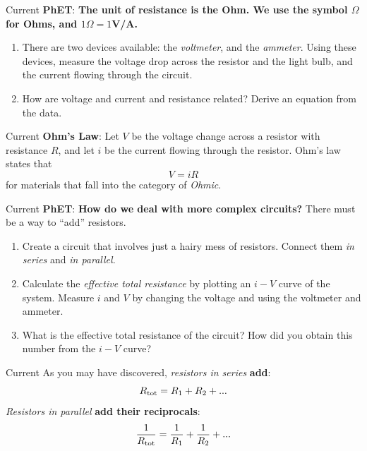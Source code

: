 \documentclass{beamer}
\begin{document}
\begin{frame}{Current}
\textbf{\alert{PhET}}: \textbf{The unit of resistance is the Ohm.  We use the symbol $\Omega$ for Ohms, and $1\Omega = 1$V/A.}
\begin{enumerate}
\item There are two devices available: the \textit{voltmeter}, and the \textit{ammeter}.  Using these devices, measure the voltage drop across the resistor and the light bulb, and the current flowing through the circuit.
\item How are voltage and current and resistance related?  Derive an equation from the data.
\end{enumerate}
\end{frame}

\begin{frame}{Current}
\textbf{Ohm's Law}: Let $V$ be the voltage change across a resistor with resistance $R$, and let $i$ be the current flowing through the resistor.  Ohm's law states that
\begin{equation}
\boxed{
V = iR}
\end{equation}
for materials that fall into the category of \textit{Ohmic}.
\end{frame}

\begin{frame}{Current}
\textbf{\alert{PhET}}: \textbf{How do we deal with more complex circuits?} There must be a way to ``add'' resistors.
\begin{enumerate}
\item Create a circuit that involves just a hairy mess of resistors.  Connect them \textit{in series} and \textit{in parallel}.
\item Calculate the \textit{effective total resistance} by plotting an $i-V$ curve of the system.  Measure $i$ and $V$ by changing the voltage and using the voltmeter and ammeter.
\item What is the effective total resistance of the circuit?  How did you obtain this number from the $i-V$ curve?
\end{enumerate}
\end{frame}

\begin{frame}{Current}
As you may have discovered, \textit{resistors in series} \textbf{add}:
\begin{equation}
R_{\rm tot} = R_1 + R_2 + ...
\end{equation}
\textit{Resistors in parallel} \textbf{add their reciprocals}:
\begin{equation}
\frac{1}{R_{\rm tot}} = \frac{1}{R_1}+\frac{1}{R_2}+...
\end{equation}
\end{frame}
\end{document}
